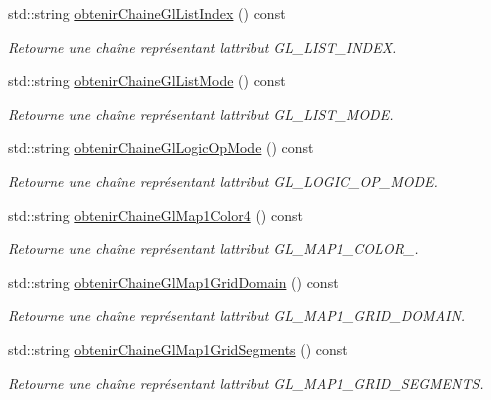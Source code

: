 \begin{DoxyCompactItemize}
std\+::string \hyperlink{group__utilitaire_ga4486b4e688ef8a216e16b7c1a6ec7a61}{obtenir\+Chaine\+Gl\+List\+Index} () const 
\begin{DoxyCompactList}\small\item\em Retourne une chaîne représentant l\textquotesingle{}attribut G\+L\+\_\+\+L\+I\+S\+T\+\_\+\+I\+N\+D\+E\+X. \end{DoxyCompactList}\item 
std\+::string \hyperlink{group__utilitaire_ga75eb73d049c2865922e414f5a06b749a}{obtenir\+Chaine\+Gl\+List\+Mode} () const 
\begin{DoxyCompactList}\small\item\em Retourne une chaîne représentant l\textquotesingle{}attribut G\+L\+\_\+\+L\+I\+S\+T\+\_\+\+M\+O\+D\+E. \end{DoxyCompactList}\item 
std\+::string \hyperlink{group__utilitaire_gaf88292802715427e1a4e58f591b8e67e}{obtenir\+Chaine\+Gl\+Logic\+Op\+Mode} () const 
\begin{DoxyCompactList}\small\item\em Retourne une chaîne représentant l\textquotesingle{}attribut G\+L\+\_\+\+L\+O\+G\+I\+C\+\_\+\+O\+P\+\_\+\+M\+O\+D\+E. \end{DoxyCompactList}\item 
std\+::string \hyperlink{group__utilitaire_gaa3e13a4accbc22c40a52ee9cee9fc3e0}{obtenir\+Chaine\+Gl\+Map1\+Color4} () const 
\begin{DoxyCompactList}\small\item\em Retourne une chaîne représentant l\textquotesingle{}attribut G\+L\+\_\+\+M\+A\+P1\+\_\+\+C\+O\+L\+O\+R\+\_. \end{DoxyCompactList}\item 
std\+::string \hyperlink{group__utilitaire_gad05cd2af4f512deb88aca0b00b0815c4}{obtenir\+Chaine\+Gl\+Map1\+Grid\+Domain} () const 
\begin{DoxyCompactList}\small\item\em Retourne une chaîne représentant l\textquotesingle{}attribut G\+L\+\_\+\+M\+A\+P1\+\_\+\+G\+R\+I\+D\+\_\+\+D\+O\+M\+A\+I\+N. \end{DoxyCompactList}\item 
std\+::string \hyperlink{group__utilitaire_gaef4171a2ed92756d394ed8bae1fc57cd}{obtenir\+Chaine\+Gl\+Map1\+Grid\+Segments} () const 
\begin{DoxyCompactList}\small\item\em Retourne une chaîne représentant l\textquotesingle{}attribut G\+L\+\_\+\+M\+A\+P1\+\_\+\+G\+R\+I\+D\+\_\+\+S\+E\+G\+M\+E\+N\+T\+S. \end{DoxyCompactList}\item 

\end{DoxyCompactItemize}
